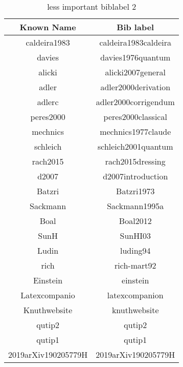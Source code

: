 \documentclass{article}
\begin{document}
\newpage
\begin{table}[ht]
    \centering
    \begin{tabular}{c|c}
     Known Name & Bib label \\\hline
     caldeira1983 & caldeira1983caldeira\\
     davies  & davies1976quantum\\
     alicki  & alicki2007general\\
     adler  & adler2000derivation\\
     adlerc & adler2000corrigendum\\
     peres2000 & peres2000classical\\
    mechnics  & mechnics1977claude\\
    schleich  & schleich2001quantum\\
    rach2015 & rach2015dressing\\
    d2007 & d2007introduction\\
    Batzri  & Batzri1973\\
    Sackmann  & Sackmann1995a\\
    Boal  & Boal2012\\
    SunH & SunHI03\\
    Ludin & luding94\\
    rich  & rich-mart92\\
    Einstein & einstein\\
    Latexcompanio & latexcompanion\\
    Knuthwebsite & knuthwebsite\\
    qutip2 & qutip2\\
    qutip1 & qutip1 \\
    2019arXiv190205779H & 2019arXiv190205779H
    \end{tabular}
    \caption{less important biblabel 2}
    \label{tab:less important biblabel 2}
\end{table}
\newpage




\end{document}
